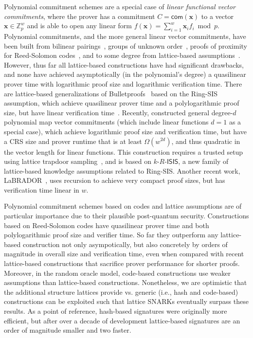 Polynomial commitment schemes are a special case of \emph{linear functional vector commitments}, where the prover has a commitment $C = \textsf{com}(\mathbf{x})$ to a vector $\mathbf{x} \in \mathbb{Z}_p^w$ and is able to open any linear form $f(\mathbf{x}) = \sum_{i = 1}^w \mathbf{x}_i f_i \bmod p$. Polynomial commitments, and the more general linear vector commitments, have been built from bilinear pairings~\cite{AC:KatZavGol10}, groups of unknown order~\cite{EC:BunFisSze20}, proofs of proximity for Reed-Solomon codes~\cite{ICALP:BBHR18}, and to some degree from lattice-based assumptions~\cite{C:ACLMT22}. However, thus far all lattice-based constructions have had significant drawbacks, and none have achieved asymptotically (in the polynomial's degree) a quasilinear prover time with logarithmic proof size and logarithmic verification time. There are lattice-based generalizations of Bulletproofs~\cite{EC:BCCGP16,SP:BBBPWM18} based on the Ring-SIS assumption, which achieve quasilinear prover time and a polylogarithmic proof size, but have linear verification time~\cite{C:BLNS20,C:AttCraKoh21,C:AlbLai21}. Recently, \cite{C:ACLMT22} constructed general degree-$d$ polynomial map vector commitments (which include linear functions $d = 1 $ as a special case), which achieve logarithmic proof size and verification time, but have a CRS size and prover runtime that is at least $\Omega(w^{2d})$, and thus quadratic in the vector length for linear functions. This construction requires a trusted setup using lattice trapdoor sampling~\cite{EC:MicPei12}, and is based on $k\text{-}R\text{-}\mathsf{ISIS}$, a new family of lattice-based knowledge assumptions related to Ring-SIS. Another recent work, LaBRADOR~\cite{BS22}, uses recursion to achieve very compact proof sizes, but has verification time linear in $w$.

Polynomial commitment schemes based on codes and lattice assumptions are of particular importance due to their plausible post-quantum security. Constructions based on Reed-Solomon codes have quasilinear prover time and both polylogarithmic proof size and verifier time. So far they outperform any lattice-based construction not only asympotically, but also concretely by orders of magnitude in overall size and verification time, even when compared with recent lattice-based constructions that sacrifice prover performance for shorter proofs. Moreover, in the random oracle model, code-based constructions use weaker  assumptions than lattice-based constructions. Nonetheless, we are optimistic that the additional structure lattices provide vs. generic (i.e., hash and code-based) constructions can be exploited such that lattice SNARKs eventually surpass these results. As a point of reference, hash-based signatures were originally more efficient, but after over a decade of development lattice-based signatures are an order of magnitude smaller and two faster.


